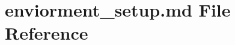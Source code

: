\hypertarget{enviorment__setup_8md}{}\section{enviorment\+\_\+setup.\+md File Reference}
\label{enviorment__setup_8md}
